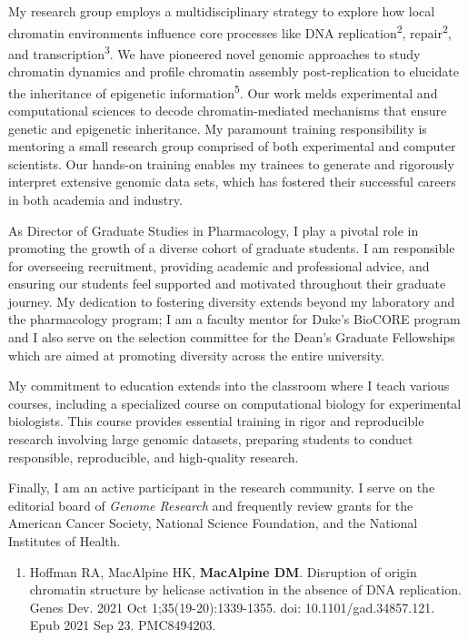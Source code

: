 \begin{statement}
My research group employs a multidisciplinary strategy to explore how local chromatin environments influence core processes like DNA replication\textsuperscript{2}, repair\textsuperscript{2}, and transcription\textsuperscript{3}. We have pioneered novel genomic approaches to study chromatin dynamics and profile chromatin assembly post-replication to elucidate the inheritance of epigenetic information\textsuperscript{5}. Our work melds experimental and computational sciences to decode chromatin-mediated mechanisms that ensure genetic and epigenetic inheritance. My paramount training responsibility is mentoring a small research group comprised of both experimental and computer scientists. Our hands-on training enables my trainees to generate and rigorously interpret extensive genomic data sets, which has fostered their successful careers in both academia and industry.

As Director of Graduate Studies in Pharmacology, I play a pivotal role in promoting the growth of a diverse cohort of graduate students. I am responsible for overseeing recruitment, providing academic and professional advice, and ensuring our students feel supported and motivated throughout their graduate journey. My dedication to fostering diversity extends beyond my laboratory and the pharmacology program; I am a faculty mentor for Duke's  BioCORE program and I also serve on the selection committee for the Dean's Graduate Fellowships which are aimed at promoting diversity across the entire university.  

My commitment to education extends into the classroom where I teach various courses, including a specialized course on computational biology for experimental biologists. This course provides essential training in rigor and reproducible research involving large genomic datasets, preparing students to conduct responsible, reproducible, and high-quality research.

 Finally, I am an active participant in the research community. I serve on the editorial board of \textit{Genome Research} and frequently review grants for the American Cancer Society, National Science Foundation, and the National Institutes of Health.  

\begin{enumerate}

\item Hoffman RA, MacAlpine HK, \textbf{MacAlpine DM}. Disruption of origin chromatin structure by helicase activation in the absence of DNA replication. Genes Dev. 2021 Oct 1;35(19-20):1339-1355. doi: 10.1101/gad.34857.121. Epub 2021 Sep 23. PMC8494203.


\end{enumerate}
\end{statement}
